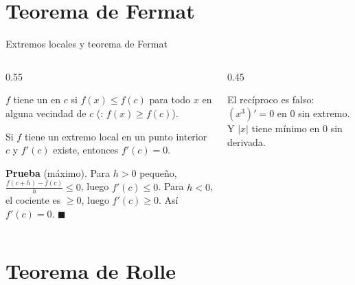 \documentclass[10pt,aspectratio=169]{beamer}
\begin{document}
\section{Teorema de Fermat}

\begin{frame}{Extremos locales y teorema de Fermat}
  \begin{columns}
    \begin{column}{0.55\textwidth}
      \begin{definicion}
        $f$ tiene un  en $c$ si $f(x)\le f(c)$ para todo $x$ en alguna vecindad de $c$
        (: $f(x)\ge f(c)$).
      \end{definicion}
      \begin{teorema}[Fermat]
        Si $f$ tiene un extremo local en un punto interior $c$ y $f'(c)$ existe, entonces $f'(c)=0$.
      \end{teorema}
      \textbf{Prueba} (máximo). Para $h>0$ pequeño, $\frac{f(c+h)-f(c)}{h}\le0$, luego $f'(c)\le0$. Para $h<0$, el cociente es $\ge0$, luego $f'(c)\ge0$.
      Así $f'(c)=0$. $\blacksquare$
    \end{column}
    \begin{column}{0.45\textwidth}
      \centering
      \begin{observacion}
        El recíproco es falso: $(x^3)'=0$ en $0$ sin extremo. Y $|x|$ tiene mínimo en $0$ sin derivada.
      \end{observacion}
    \end{column}
  \end{columns}
\end{frame}

\section{Teorema de Rolle}
\end{document}
